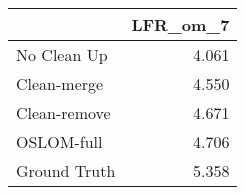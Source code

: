 \begin{tabular}{lr}
\toprule
{} & LFR_om_7 \\
\midrule
No Clean Up  &    4.061 \\
Clean-merge  &    4.550 \\
Clean-remove &    4.671 \\
OSLOM-full   &    4.706 \\
Ground Truth &    5.358 \\
\bottomrule
\end{tabular}
